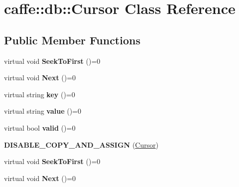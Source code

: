 \hypertarget{classcaffe_1_1db_1_1_cursor}{}\section{caffe\+:\+:db\+:\+:Cursor Class Reference}
\label{classcaffe_1_1db_1_1_cursor}
\subsection*{Public Member Functions}
\begin{DoxyCompactItemize}
\item 
\mbox{\label{classcaffe_1_1db_1_1_cursor_a07896b619ea1e802b8d3b55782ef3a8a}} 
virtual void {\bfseries Seek\+To\+First} ()=0
\item 
\mbox{\label{classcaffe_1_1db_1_1_cursor_ab90dc953417f37d0d4247b125ea1ae37}} 
virtual void {\bfseries Next} ()=0
\item 
\mbox{\label{classcaffe_1_1db_1_1_cursor_a87ec068564018e9218360db6fb1dade3}} 
virtual string {\bfseries key} ()=0
\item 
\mbox{\label{classcaffe_1_1db_1_1_cursor_ad6de2be246e7b46c00d34c29b24e16ee}} 
virtual string {\bfseries value} ()=0
\item 
\mbox{\label{classcaffe_1_1db_1_1_cursor_ae3811414ce9044a639195462be9e4f38}} 
virtual bool {\bfseries valid} ()=0
\item 
\mbox{\label{classcaffe_1_1db_1_1_cursor_acbd3ccf06a180bd19079a2fec0a6a8f2}} 
{\bfseries D\+I\+S\+A\+B\+L\+E\+\_\+\+C\+O\+P\+Y\+\_\+\+A\+N\+D\+\_\+\+A\+S\+S\+I\+GN} (\mbox{\hyperlink{classcaffe_1_1db_1_1_cursor}{Cursor}})
\item 
\mbox{\label{classcaffe_1_1db_1_1_cursor_a07896b619ea1e802b8d3b55782ef3a8a}} 
virtual void {\bfseries Seek\+To\+First} ()=0
\item 
\mbox{\label{classcaffe_1_1db_1_1_cursor_ab90dc953417f37d0d4247b125ea1ae37}} 
virtual void {\bfseries Next} ()=0

\end{DoxyCompactItemize}
